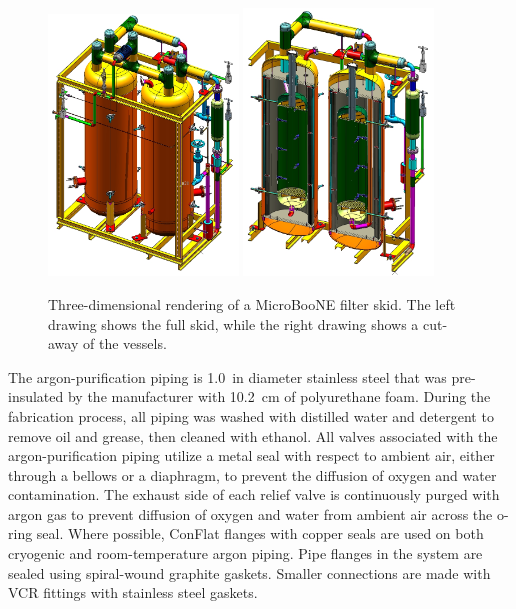 \begin{figure}
\centering 
\includegraphics[width=0.45\textwidth]{figures/cryo-filter-skid}
\includegraphics[width=0.45\textwidth]{figures/cryo-filter-skid-cutaway}
\caption{Three-dimensional rendering of a MicroBooNE filter skid.  The left drawing shows the full skid, while the right drawing shows a cut-away of the vessels.}
\label{filters}
\end{figure}



The argon-purification piping is 1.0~in diameter stainless steel that was pre-insulated by the manufacturer with 10.2~cm of polyurethane foam.  During the fabrication process, all piping was washed with distilled water and detergent to remove oil and grease, then cleaned with ethanol.  All valves associated with the argon-purification piping utilize a metal seal with respect to ambient air, either through a bellows or a diaphragm, to prevent the diffusion of oxygen and water contamination.  The exhaust side of each relief valve is continuously purged with argon gas to prevent diffusion of oxygen and water from ambient air across the o-ring seal.  Where possible, ConFlat flanges with copper seals are used on both cryogenic and room-temperature argon piping.  Pipe flanges in the system are sealed using spiral-wound graphite gaskets.  Smaller connections are made with VCR fittings with stainless steel gaskets.  

